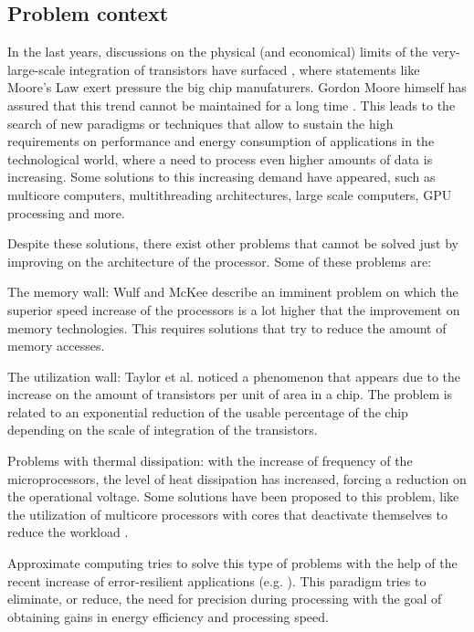 \subsection{Problem context}

In the last years, discussions on the physical (and economical) limits of the very-large-scale integration 
of transistors have surfaced \cite{aftermoore}\cite{moorelawlimit}, where statements like Moore's Law exert pressure the big chip manufaturers.
Gordon Moore himself has assured that this trend cannot be maintained for a long time \cite{mooredead}. This leads to the
search of new paradigms or techniques that allow to sustain the high requirements on performance and 
energy consumption of applications in the technological world, where a need to process even higher amounts
of data is increasing. Some solutions to this increasing demand have appeared, such as multicore computers,
multithreading architectures, large scale computers, GPU processing and more.

Despite these solutions, there exist other problems that cannot be solved just by improving on the architecture
of the processor. Some of these problems are:

\begin{compactitem}
    \item The memory wall: Wulf and McKee \cite{memorywall} describe an imminent problem on which the superior speed increase
    of the processors is a lot higher that the improvement on memory technologies. This requires solutions that
    try to reduce the amount of memory accesses.
    \item The utilization wall: Taylor et al. \cite{utilizationwall} noticed a phenomenon that appears due to the increase on the amount
    of transistors per unit of area in a chip. The problem is related to an exponential reduction of the usable
    percentage of the chip depending on the scale of integration of the transistors.
    \item Problems with thermal dissipation: with the increase of frequency of the microprocessors, the level of 
    heat dissipation has increased, forcing a reduction on the operational voltage. Some solutions have been proposed
    to this problem, like the utilization of multicore processors with cores that deactivate themselves to reduce
    the workload \cite{whitepaper}.
\end{compactitem}

Approximate computing tries to solve this type of problems with the help of the recent increase of error-resilient
applications (e.g. \cite{errortolerant}). This paradigm tries to eliminate, or reduce, the need for precision
during processing with the goal of obtaining gains in energy efficiency and processing speed.

